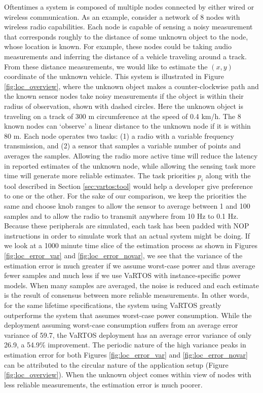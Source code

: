 Oftentimes a system is composed of multiple nodes connected by either wired or wireless communication.  As an example, consider a network of 8 nodes with wireless radio capabilities.  Each node is capable of sensing a noisy measurement that corresponds roughly to the distance of some unknown object to the node, whose location is known.  For example, these nodes could be taking audio measurements and inferring the distance of a vehicle traveling around a track.  From these distance measurements, we would like to estimate the $(x,y)$ coordinate of the unknown vehicle.  This system is illustrated in Figure \ref{fig:loc_overview}, where the unknown object makes a counter-clockwise path and the known sensor nodes take noisy measurements if the object is within their radius of observation, shown with dashed circles.  Here the unknown object is traveling on a track of 300 m circumference at the speed of 0.4 km/h. The 8 known nodes can `observe' a linear distance to the unknown node if it is within 80 m.  Each node operates two tasks: (1) a radio with a variable frequency transmission, and (2) a sensor that samples a variable number of points and averages the samples.   Allowing the radio more active time will reduce the latency in reported estimates of the unknown node, while allowing the sensing task more time will generate more reliable estimates.  The task priorities $p_i$ along with the tool described in Section \ref{sec:vartos:tool} would help a developer give preference to one or the other. For the sake of our comparison, we keep the priorities the same and choose knob ranges to allow the sensor to average between 1 and 100 samples and to allow the radio to transmit anywhere from 10 Hz to 0.1 Hz.  Because these peripherals are simulated, each task has been padded with NOP instructions in order to simulate work that an actual system might be doing.  If we look at a 1000 minute time slice of the estimation process as shown in Figures \ref{fig:loc_error_var} and \ref{fig:loc_error_novar}, we see that the variance of the estimation error is much greater if we assume worst-case power and thus average fewer samples and much less if we use VaRTOS with instance-specific power models.  When many samples are averaged, the noise is reduced and each estimate is the result of consensus between more reliable measurements.  In other words, for the same lifetime specifications, the system using VaRTOS greatly outperforms the system that assumes worst-case power consumption.  While the deployment assuming worst-case consumption suffers from an average error variance of 59.7, the VaRTOS deployment has an average error variance of only 26.9, a 54.9\% improvement.  The periodic nature of the high variance peaks in estimation error for both Figures \ref{fig:loc_error_var} and \ref{fig:loc_error_novar} can be attributed to the circular nature of the application setup (Figure \ref{fig:loc_overview}).  When the unknown object comes within view of nodes with less reliable measurements, the estimation error is much poorer. 

